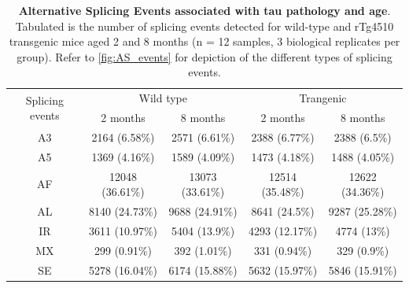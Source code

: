 \vspace{2cm}
\begin{table}[!htp]
	\centering
	\captionsetup{width=1\textwidth}
	\caption[Alternative Splicing Events associated with tau pathology and age]%
	{\textbf{Alternative Splicing Events associated with tau pathology and age}. Tabulated is the number of splicing events detected for wild-type and rTg4510 transgenic mice aged 2 and 8 months (n = 12 samples, 3 biological replicates per group). Refer to \cref{fig:AS_events} for depiction of the different types of splicing events.}
	\begin{tabular}{@{}ccccc@{}}
		\toprule
		\multirow{2}{*}{Splicing  events} & \multicolumn{2}{c}{Wild type} & \multicolumn{2}{c}{Trangenic} \\ \cmidrule(l){2-5} 
		& 2 months        & 8 months        & 2 months        & 8 months        \\ \midrule
		A3 & 2164 (6.58\%)   & 2571 (6.61\%)   & 2388 (6.77\%)   & 2388 (6.5\%)    \\
		A5 & 1369 (4.16\%)   & 1589 (4.09\%)   & 1473 (4.18\%)   & 1488 (4.05\%)   \\
		AF & 12048 (36.61\%) & 13073 (33.61\%) & 12514 (35.48\%) & 12622 (34.36\%) \\
		AL & 8140 (24.73\%)  & 9688 (24.91\%)  & 8641 (24.5\%)   & 9287 (25.28\%)  \\
		IR & 3611 (10.97\%)  & 5404 (13.9\%)   & 4293 (12.17\%)  & 4774 (13\%)     \\
		MX & 299 (0.91\%)    & 392 (1.01\%)    & 331 (0.94\%)    & 329 (0.9\%)     \\
		SE & 5278 (16.04\%)  & 6174 (15.88\%)  & 5632 (15.97\%)  & 5846 (15.91\%)  \\ \bottomrule
	\end{tabular}
	\label{AS_WholeTranscriptome_diff}
\end{table}


